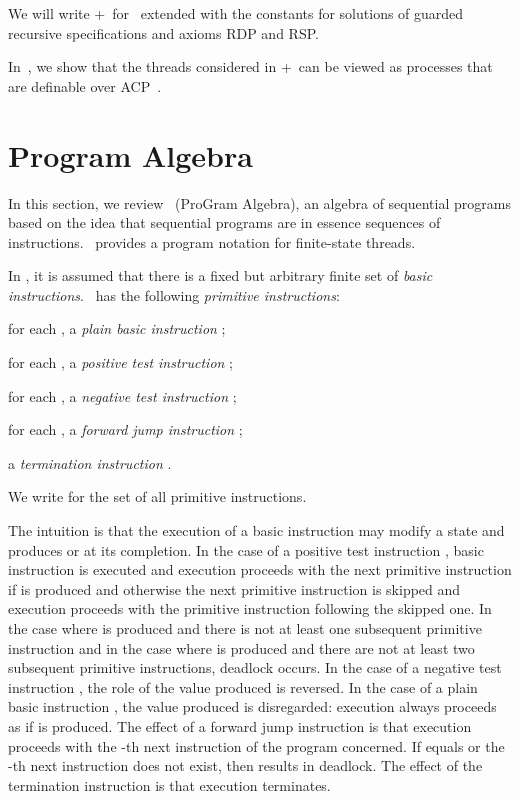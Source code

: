 \documentclass[fleqn]{llncs}
\begin{document}
We will write \BTA+\REC\ for \BTA\ extended with the constants for
solutions of guarded recursive specifications and axioms RDP and RSP.

In~\cite{BM05c}, we show that the threads considered in \BTA+\REC\ can
be viewed as processes that are definable over ACP~\cite{Fok00}.

\section{Program Algebra}
\label{sect-PGA}

In this section, we review \PGA\ (ProGram Algebra), an algebra of
sequential programs based on the idea that sequential programs are in
essence sequences of instructions.
\PGA\ provides a program notation for finite-state threads.

In \PGA, it is assumed that there is a fixed but arbitrary finite set
 of \emph{basic instructions}.
\PGA\ has the following \emph{primitive instructions}:
\begin{iteml}
\item
for each , a \emph{plain basic instruction} ;
\item
for each , a \emph{positive test instruction} ;
\item
for each , a \emph{negative test instruction} ;
\item
for each , a \emph{forward jump instruction} ;
\item
a \emph{termination instruction} .
\end{iteml}
We write  for the set of all primitive instructions.

The intuition is that the execution of a basic instruction  may
modify a state and produces  or  at its completion.
In the case of a positive test instruction , basic instruction
 is executed and execution proceeds with the next primitive
instruction if  is produced and otherwise the next primitive
instruction is skipped and execution proceeds with the primitive
instruction following the skipped one.
In the case where  is produced and there is not at least one
subsequent primitive instruction and in the case where  is
produced and there are not at least two subsequent primitive
instructions, deadlock occurs.
In the case of a negative test instruction , the role of the
value produced is reversed.
In the case of a plain basic instruction , the value produced is
disregarded: execution always proceeds as if  is produced.
The effect of a forward jump instruction  is that execution
proceeds with the -th next instruction of the program concerned.
If  equals  or the -th next instruction does not exist, then
 results in deadlock.
The effect of the termination instruction  is that execution
terminates.
\end{document}
